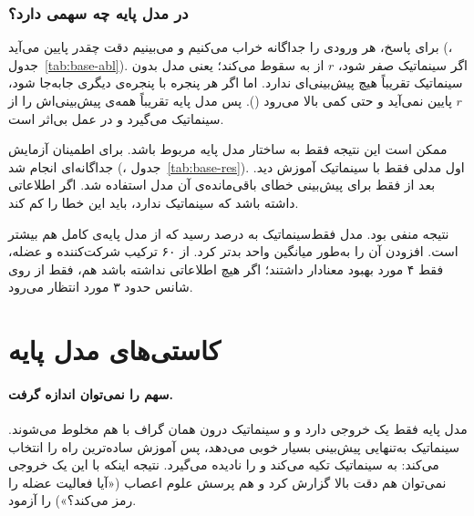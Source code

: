 \subsubsection*{ در مدل پایه چه سهمی دارد؟}

برای پاسخ، هر ورودی را جداگانه خراب می‌کنیم و می‌بینیم دقت چقدر پایین می‌آید (، جدول~\ref{tab:base-abl}). اگر سینماتیک صفر شود، $r$ از  به  سقوط می‌کند؛ یعنی مدل بدون سینماتیک تقریباً هیچ پیش‌بینی‌ای ندارد. اما اگر  هر پنجره با  پنجره‌ی دیگری جابه‌جا شود، $r$ پایین نمی‌آید و حتی کمی بالا می‌رود (). پس مدل پایه تقریباً همه‌ی پیش‌بینی‌اش را از سینماتیک می‌گیرد و  در عمل بی‌اثر است.



ممکن است این نتیجه فقط به ساختار مدل پایه مربوط باشد. برای اطمینان آزمایش جداگانه‌ای انجام شد (، جدول~\ref{tab:base-res}). اول مدلی فقط با سینماتیک آموزش دید. بعد از  فقط برای پیش‌بینی خطای باقی‌مانده‌ی آن مدل استفاده شد. اگر  اطلاعاتی داشته باشد که سینماتیک ندارد، باید این خطا را کم کند.

نتیجه منفی بود. مدل فقط‌سینماتیک به   درصد رسید که از مدل پایه‌ی کامل هم بیشتر است. افزودن  آن را به‌طور میانگین  واحد بدتر کرد. از ۶۰ ترکیب شرکت‌کننده و عضله، فقط ۴ مورد بهبود معنادار داشتند؛ اگر  هیچ اطلاعاتی نداشته باشد هم، فقط از روی شانس حدود ۳ مورد انتظار می‌رود.



\FloatBarrier
\section{کاستی‌های مدل پایه}
\label{sec:gaps}

\paragraph{سهم  را نمی‌توان اندازه گرفت.} مدل پایه فقط یک خروجی دارد و  و سینماتیک درون همان گراف با هم مخلوط می‌شوند. سینماتیک به‌تنهایی پیش‌بینی بسیار خوبی می‌دهد، پس آموزش ساده‌ترین راه را انتخاب می‌کند: به سینماتیک تکیه می‌کند و  را نادیده می‌گیرد. نتیجه اینکه با این یک خروجی نمی‌توان هم دقت بالا گزارش کرد و هم پرسش علوم اعصاب («آیا  فعالیت عضله را رمز می‌کند؟») را آزمود.

